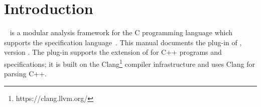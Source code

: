 \chapter{Introduction}

\framac~\cite{userman,fac15} is a modular analysis framework for the C
programming language which supports the \acsl specification
language~\cite{acsl}. This manual documents the \fclang plug-in of \framac,
version \fclangversion. 
The \fclang plug-in supports the \acslpp extension of \acsl for C++ programs and specifications; 
it is built on the Clang\footnote{https://clang.llvm.org/} compiler infrastructure and uses Clang for 
parsing C++.




